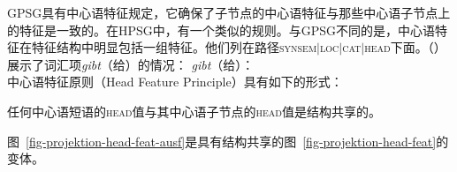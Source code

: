 GPSG\indexgpsg 具有中心语特征规定，它确保了子节点的中心语特征与那些中心语子节点上的特征是一致的。在HPSG中，有一个类似的规则。与GPSG不同的是，中心语特征在特征结构中明显包括一组特征。他们列在路径\textsc{synsem$|$loc$|$cat$|$head}下面。（）展示了词汇项\emph{gibt}（给）的情况：
\eas
\emph{gibt}（给）：\\
\zs
\addlines
中心语特征原则（Head Feature Principle）具有如下的形式：
\begin{principle-break}[中心语特征原则]
\label{prinzip-hfp}
任何中心语短语的\textsc{head}值与其中心语子节点的\textsc{head}值是结构共享的。
\end{principle-break}
图~\vref{fig-projektion-head-feat-ausf}是具有结构共享的图~\ref{fig-projektion-head-feat}的变体。
